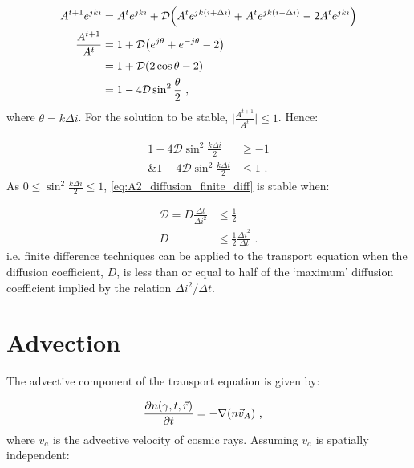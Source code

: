 \begin{equation}
    \begin{aligned}
    A^{t+1}e^{jki}&=A^te^{jki}+\mathcal{D}\qty(A^{t}e^{jk\qty(i+\Delta i)}+A^{t}e^{jk\qty(i-\Delta i)}-2A^te^{jki}) \\
    \frac{A^{t+1}}{A^t}&=1+\mathcal{D}\qty(e^{j\theta}+e^{-j\theta}-2) \\
    &=1+\mathcal{D}\qty(2\cos\theta-2) \\
    &=1-4\mathcal{D}\sin^2\frac{\theta}{2}\text{ ,} 
    \end{aligned}
\end{equation}
\noindent where $\theta=k\Delta i$. For the solution to be stable, $\lvert \frac{A^{t+1}}{A^t}\rvert\leq 1$. Hence:

\begin{equation}
    \begin{aligned}
    1-4\mathcal{D}\sin^2\frac{k\Delta i}{2} &\geq -1 \\
    \text{\& } 1-4\mathcal{D}\sin^2\frac{k\Delta i}{2} &\leq 1 \text{ .} 
    \end{aligned} \label{eq:A2_diffusion_finite_stability_cond}
\end{equation}
\noindent As $0\leq \sin^2\frac{k\Delta i}{2}\leq 1$, \autoref{eq:A2_diffusion_finite_diff} is stable when:

\begin{equation}
    \begin{aligned}
    \mathcal{D}=D\frac{\Delta t}{\Delta i^2}&\leq \frac{1}{2} \\
    D&\leq \frac{1}{2}\frac{\Delta i^2}{\Delta t}\text{ .} 
    \end{aligned}
\end{equation}
\noindent i.e. finite difference techniques can be applied to the transport equation when the diffusion coefficient, $D$, is less than or equal to half of the `maximum' diffusion coefficient implied by the relation $\Delta i^2/\Delta t$.

\section{Advection}

The advective component of the transport equation is given by:

\begin{equation}
    \begin{aligned}
        \pdv{n\qty(\gamma,t,\vec{r})}{t}&=-\nabla\qty(n\vec{v}_A)\text{ ,} 
    \end{aligned}
\end{equation}
\noindent where $v_a$ is the advective velocity of cosmic rays. Assuming $v_a$ is spatially independent:

